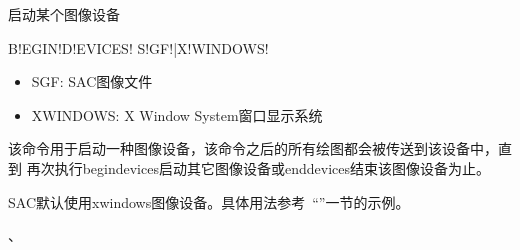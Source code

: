\label{cmd:begindevices}

启动某个图像设备

\begin{SACSTX}
B!EGIN!D!EVICES! S!GF!|X!WINDOWS!
\end{SACSTX}

\begin{itemize}
\item SGF: SAC图像文件
\item XWINDOWS: X Window System窗口显示系统
\end{itemize}

该命令用于启动一种图像设备，该命令之后的所有绘图都会被传送到该设备中，直到
再次执行begindevices启动其它图像设备或enddevices结束该图像设备为止。

SAC默认使用xwindows图像设备。具体用法参考~``''一节的示例。

、
